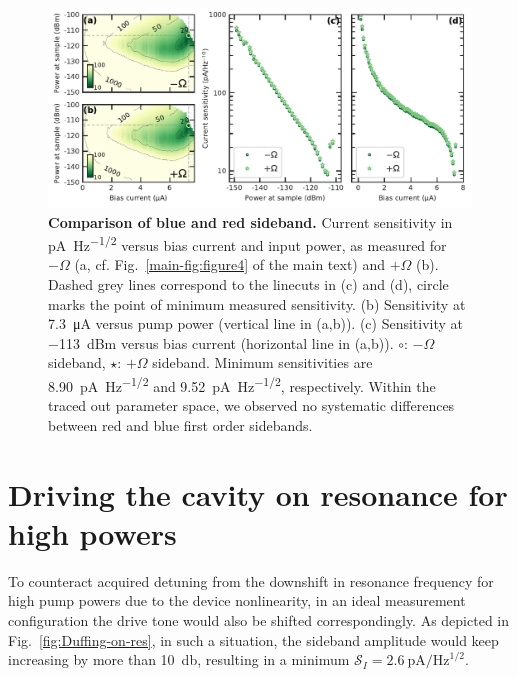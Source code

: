 \begin{figure}
	\centering
	\includegraphics[width=\linewidth]{chapter-currentdetection/figures/SM_plusminus}
	\caption{
		\textbf{Comparison of blue and red sideband.}
		Current sensitivity in \si{\pico\ampere\per\hertz\tothe{1/2}} versus bias current and input power, as measured for $-\Omega$ (a, cf. Fig.~\ref{main-fig:figure4} of the main text) and $+\Omega$ (b).
		Dashed grey lines correspond to the linecuts in (c) and (d), circle marks the point of minimum measured sensitivity.
		(b) Sensitivity at \SI{7.3}{\micro\ampere} versus pump power (vertical line in (a,b)).
		(c) Sensitivity at \SI{-113}{dBm} versus bias current (horizontal line in (a,b)).
		$\circ$: $-\Omega$ sideband, $\star$: $+\Omega$ sideband.
		Minimum sensitivities are \SI{8.90}{\pico\ampere\per\hertz\tothe{1/2}} and \SI{9.52}{\pico\ampere\per\hertz\tothe{1/2}}, respectively.
		Within the traced out parameter space, we observed no systematic differences between red and blue first order sidebands.
	}
	\label{fig:plusminus}
\end{figure}


\section{Driving the cavity on resonance for high powers}\label{sec:drive_shift}
To counteract acquired detuning from the downshift in resonance frequency for high pump powers due to the device nonlinearity, in an ideal measurement configuration the drive tone would also be shifted correspondingly.
% 
As depicted in Fig.~\ref{fig:Duffing-on-res}, in such a situation, the sideband amplitude would keep increasing by more than \SI{10}{\decibel}, resulting in a minimum $\mathcal{S}_I=\SI{2.6}{\pico\ampere\per\hertz\tothe{1/2}}$.

